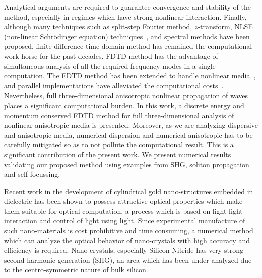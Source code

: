 \documentclass{article}[12pt]
\theoremstyle{plain}
\begin{document}
Analytical arguments are required to guarantee convergence and stability of the method, especially
in regimes which have strong nonlinear interaction.
Finally, although many techniques such as split-step Fourier method, $z$-transform,
NLSE (non-linear Schr{\"o}dinger equation) techniques~\cite{fibich2015nonlinear},
and spectral methods have been proposed, finite difference time domain method has remained the
computational work horse for the past decades. 
FDTD method has the advantage of simultaneous analysis of all the required frequency modes
in a single computation.
The FDTD method has been extended to handle
nonlinear media~\cite{joseph1997fdtd}, and parallel implementations have alleviated the computational costs~\cite{yu2006parallel}.
Nevertheless, full three-dimensional anisotropic nonlinear propagation of waves places
a significant computational burden. In this work, a discrete energy and momentum conserved
FDTD method for full three-dimensional analysis of nonlinear anisotropic media is presented.
Moreover, as we are analyzing dispersive and anisotropic media, numerical dispersion and
numerical anisotropic has to be carefully mitigated so as to not pollute the computational
result. This is a significant contribution of the present work. We present numerical results
validating our proposed method using examples from SHG, soliton propagation and self-focussing.

Recent work in the development of cylindrical gold nano-structures embedded in dielectric
has been shown to possess attractive optical properties which make them suitable for optical
computation,  a process which is based on light-light interaction and control of light using light.
Since experimental manufacture of such nano-materials is cost prohibitive and time consuming, a
numerical method which can analyze the optical behavior of nano-crystals with high accuracy and
efficiency is required.
Nano-crystals, especially Silicon Nitride has
very strong second harmonic generation (SHG), an area which has been
under analyzed due to the centro-symmetric nature of bulk silicon.
\end{document}
